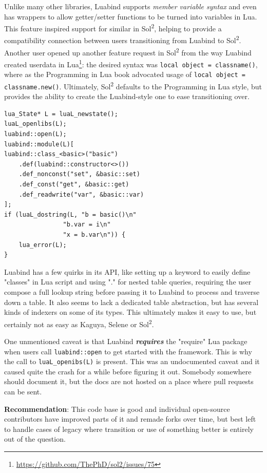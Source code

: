 \documentclass[conference,compsoc]{IEEEtran}
\newcommand{\soltwo}{Sol\textsuperscript{2}}
\begin{document}
Unlike many other libraries, Luabind supports \emph{member variable syntax} and even has wrappers to allow getter/setter functions to be turned into variables in Lua. This feature inspired support for similar in \soltwo{}, helping to provide a compatibility connection between users transitioning from Luabind to \soltwo{}. Another user opened up another feature request in \soltwo{} from the way Luabind created userdata in Lua\footnote{\url{https://github.com/ThePhD/sol2/issues/75}}: the desired syntax was \lstinline[language={[5.3]Lua}]|local object = classname()|, where as the Programming in Lua book advocated usage of \lstinline[language={[5.3]Lua}]|local object = classname.new()|. Ultimately, \soltwo{} defaults to the Programming in Lua style, but provides the ability to create the Luabind-style one to ease transitioning over.

\begin{lstlisting}[caption={A complete example for binding a class to luabind. Notice that users can access member variables with the 'a.b' syntax in Lua scripts.},label={lst:luabind-variable}]
lua_State* L = luaL_newstate();
luaL_openlibs(L);
luabind::open(L);
luabind::module(L)[
luabind::class_<basic>("basic")
	.def(luabind::constructor<>())
	.def_nonconst("set", &basic::set)
	.def_const("get", &basic::get)
	.def_readwrite("var", &basic::var)
];
if (luaL_dostring(L, "b = basic()\n"
				"b.var = i\n"
				"x = b.var\n")) {
	lua_error(L);
}
\end{lstlisting}

Luabind has a few quirks in its API, like setting up a keyword to easily define "classes" in Lua script and using "." for nested table queries, requiring the user compose a full lookup string before passing it to Luabind to process and traverse down a table. It also seems to lack a dedicated table abstraction, but has several kinds of indexers on some of its types. This ultimately makes it easy to use, but certainly not as easy as Kaguya, Selene or \soltwo{}.

One unmentioned caveat is that Luabind \emph{\textbf{requires}} the "require" Lua package when users call \lstinline|luabind::open| to get started with the framework. This is why the call to \lstinline|luaL_openibs(L)| is present. This was an undocumented caveat and it caused quite the crash for a while before figuring it out. Somebody somewhere should document it, but the docs are not hosted on a place where pull requests can be sent.

\textbf{Recommendation}: This code base is good and individual open-source contributors have improved parts of it and remade forks over time, but best left to handle cases of legacy where transition or use of something better is entirely out of the question.
\end{document}
